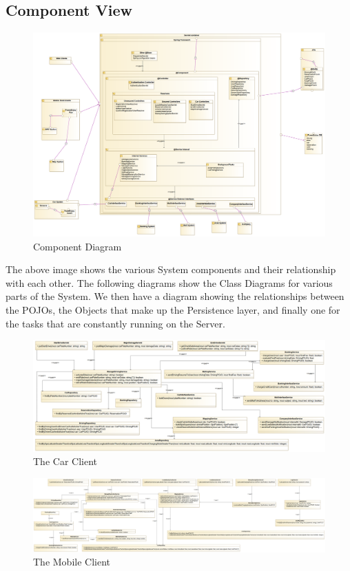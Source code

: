 \documentclass[12pt]{article}
\begin{document}
\subsection{Component View}
\begin{figure}[h]
	\centering
	\includegraphics[width=\textwidth]{../Images/Component}
	\caption{Component Diagram}
\end{figure}
The above image shows the various System components and their relationship with each other. The following diagrams show the Class Diagrams for various parts of the System.
We then have a diagram showing the relationships between the POJOs, the Objects that make up the Persistence layer, and finally one for the tasks that are constantly running on the Server.

\begin{figure}[h]
	\centering
	\includegraphics[width=\textwidth]{../Images/CarClient_Class}
	\caption{The Car Client}
\end{figure}

\begin{figure}[h]
	\centering
	\includegraphics[width=\textwidth]{../Images/MobileClient_Class}
	\caption{The Mobile Client}
\end{figure}
\end{document}
